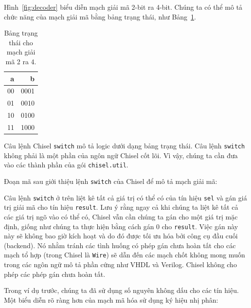 \documentclass[%
    10pt,
    headinclude, footexclude,
    openright, %
    notitlepage,
    cleardoubleempty,
    headsepline,
    pointlessnumbers,
    bibtotoc, idxtotoc,
    ]{scrbook}
\newcommand{\code}[1]{{\small{\texttt{#1}}}}
\newcommand{\todo}[1]{{\emph{TODO: #1}}}
\renewcommand{\todo}[1]{}
\begin{document}
Hình~\ref{fig:decoder} biểu diễn mạch giải mã 2-bit ra 4-bit. Chúng ta có thể mô tả chức năng của 
mạch giải mã bằng bảng trạng thái, như Bảng~\ref{tab:decoder}.

\begin{table}
 \centering
 \label{tab:decoder}
  \begin{tabular}{rr}
    \toprule
    a & b \\
    \midrule
    00 & 0001 \\
    01 & 0010 \\
    10 & 0100 \\
    11 & 1000 \\
    \bottomrule 
  \end{tabular} 
  \caption{Bảng trạng thái cho mạch giải mã 2 ra 4.}
\end{table}

Câu lệnh Chisel \code{switch} mô tả logic dưới dạng bảng trạng thái.
Câu lệnh \code{switch} không phải là một phần của ngôn ngữ Chisel cốt lõi.
Vì vậy, chúng ta cần đưa vào các thành phần của gói \code{chisel.util}.


\noindent Đoạn mã sau giới thiệu lệnh \code{switch} của Chisel để mô tả mạch giải mã:



\noindent Câu lệnh \code{switch} ở trên liệt kê tất cả giá trị có thể có của tín hiệu \code{sel} 
và gán giá trị giải mã cho tín hiệu \code{result}.
Lưu ý rằng ngay cả khi chúng ta liệt kê tất cả các giá trị ngõ vào có thể có, Chisel vẫn cần 
chúng ta gán cho một giá trị mặc định, giống như chúng ta thực hiện bằng cách gán 0 cho \code{result}.
Việc gán này này sẽ không bao giờ kích hoạt và do đó được tối ưu hóa bởi công cụ đầu cuối (backend).
Nó nhằm tránh các tình huống có phép gán chưa hoàn tất cho các mạch tổ hợp 
(trong Chisel là \code{Wire}) sẽ dẫn đến các mạch chốt không mong muốn trong các ngôn ngữ mô tả 
phần cứng như VHDL và Verilog. Chisel không cho phép các phép gán chưa hoàn tất.

Trong ví dụ trước, chúng ta đã sử dụng số nguyên không dấu cho các tín hiệu. 
Một biểu diễn rõ ràng hơn của mạch mã hóa sử dụng ký hiệu nhị phân:


\todo{from Luca: for very small examples. What if the one-hot input is 256 wires? Can Chisel capture that? Or I need 256 lines? I would suggest to put an additional example. Maybe there is something like the for loop in VHDL.}
\end{document}
